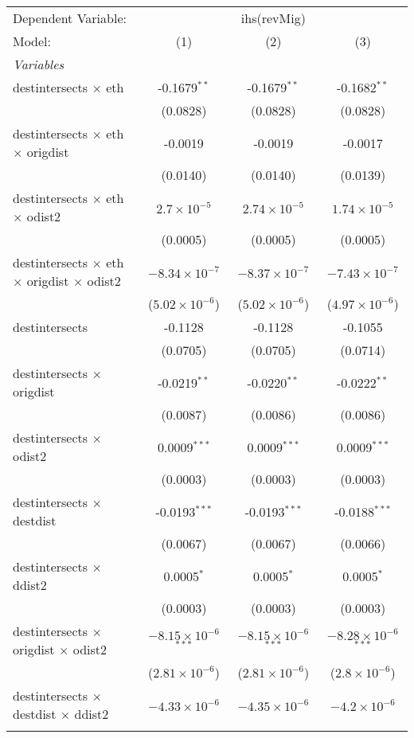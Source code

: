 \begin{tabular}{lccc}
\tabularnewline\midrule\midrule
Dependent Variable:&\multicolumn{3}{c}{ihs(revMig)}\\
Model:&(1) & (2) & (3)\\
\midrule \emph{Variables}&   &   &  \\
destintersects $\times $ eth & -0.1679$^{**}$ & -0.1679$^{**}$ & -0.1682$^{**}$\\
  &(0.0828) & (0.0828) & (0.0828)\\
destintersects $\times $ eth $\times $ origdist & -0.0019 & -0.0019 & -0.0017\\
  &(0.0140) & (0.0140) & (0.0139)\\
destintersects $\times $ eth $\times $ odist2 & $2.7\times 10^{-5}$ & $2.74\times 10^{-5}$ & $1.74\times 10^{-5}$\\
  &(0.0005) & (0.0005) & (0.0005)\\
destintersects $\times $ eth $\times $ origdist $\times $ odist2 & $-8.34\times 10^{-7}$ & $-8.37\times 10^{-7}$ & $-7.43\times 10^{-7}$\\
  &($5.02\times 10^{-6}$) & ($5.02\times 10^{-6}$) & ($4.97\times 10^{-6}$)\\
destintersects & -0.1128 & -0.1128 & -0.1055\\
  &(0.0705) & (0.0705) & (0.0714)\\
destintersects $\times $ origdist & -0.0219$^{**}$ & -0.0220$^{**}$ & -0.0222$^{**}$\\
  &(0.0087) & (0.0086) & (0.0086)\\
destintersects $\times $ odist2 & 0.0009$^{***}$ & 0.0009$^{***}$ & 0.0009$^{***}$\\
  &(0.0003) & (0.0003) & (0.0003)\\
destintersects $\times $ destdist & -0.0193$^{***}$ & -0.0193$^{***}$ & -0.0188$^{***}$\\
  &(0.0067) & (0.0067) & (0.0066)\\
destintersects $\times $ ddist2 & 0.0005$^{*}$ & 0.0005$^{*}$ & 0.0005$^{*}$\\
  &(0.0003) & (0.0003) & (0.0003)\\
destintersects $\times $ origdist $\times $ odist2 & $-8.15\times 10^{-6}$$^{***}$ & $-8.15\times 10^{-6}$$^{***}$ & $-8.28\times 10^{-6}$$^{***}$\\
  &($2.81\times 10^{-6}$) & ($2.81\times 10^{-6}$) & ($2.8\times 10^{-6}$)\\
destintersects $\times $ destdist $\times $ ddist2 & $-4.33\times 10^{-6}$ & $-4.35\times 10^{-6}$ & $-4.2\times 10^{-6}$\\
$$
\end{tabular}
